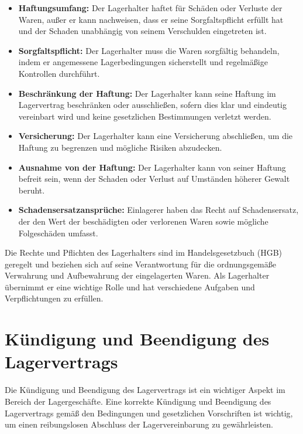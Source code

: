 \begin{itemize}
    \item \textbf{Haftungsumfang:} Der Lagerhalter haftet für Schäden oder Verluste der Waren, außer er kann nachweisen, dass er seine Sorgfaltspflicht erfüllt hat und der Schaden unabhängig von seinem Verschulden eingetreten ist.
    \item \textbf{Sorgfaltspflicht:} Der Lagerhalter muss die Waren sorgfältig behandeln, indem er angemessene Lagerbedingungen sicherstellt und regelmäßige Kontrollen durchführt.
    \item \textbf{Beschränkung der Haftung:} Der Lagerhalter kann seine Haftung im Lagervertrag beschränken oder ausschließen, sofern dies klar und eindeutig vereinbart wird und keine gesetzlichen Bestimmungen verletzt werden.
    \item \textbf{Versicherung:} Der Lagerhalter kann eine Versicherung abschließen, um die Haftung zu begrenzen und mögliche Risiken abzudecken.
    \item \textbf{Ausnahme von der Haftung:} Der Lagerhalter kann von seiner Haftung befreit sein, wenn der Schaden oder Verlust auf Umständen höherer Gewalt beruht.
    \item \textbf{Schadensersatzansprüche:} Einlagerer haben das Recht auf Schadensersatz, der den Wert der beschädigten oder verlorenen Waren sowie mögliche Folgeschäden umfasst.
\end{itemize}

Die Rechte und Pflichten des Lagerhalters sind im Handelsgesetzbuch (HGB) geregelt und beziehen sich auf seine Verantwortung für die ordnungsgemäße Verwahrung und Aufbewahrung der eingelagerten Waren. Als Lagerhalter übernimmt er eine wichtige Rolle und hat verschiedene Aufgaben und Verpflichtungen zu erfüllen.

\section{Kündigung und Beendigung des Lagervertrags}
Die Kündigung und Beendigung des Lagervertrags ist ein wichtiger Aspekt im Bereich der Lagergeschäfte. Eine korrekte Kündigung und Beendigung des Lagervertrags gemäß den Bedingungen und gesetzlichen Vorschriften ist wichtig, um einen reibungslosen Abschluss der Lagervereinbarung zu gewährleisten.


